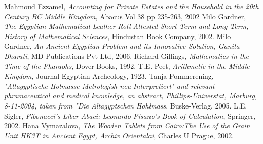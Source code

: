 \documentclass[12pt]{article}
\begin{document}
\begin{thebibliography}{8}
 Mahmoud Ezzamel, \emph{Accounting for Private Estates and the Household in the 20th Century BC Middle Kingdom}, Abacus Vol 38 pp 235-263, 2002
 Milo Gardner, \emph{The Egyptian Mathematical Leather Roll Attested Short Term and Long Term, History of Mathematical Sciences}, Hindustan Book Company, 2002.
 Milo Gardner, \emph{An Ancient Egyptian Problem and its Innovative Solution, Ganita Bharati}, MD Publications Pvt Ltd, 2006.
Richard Gillings, \emph{Mathematics in the Time of the Pharaohs}, Dover Books, 1992.
 T.E. Peet, \emph{Arithmetic in the Middle Kingdom}, Journal Egyptian Archeology, 1923.
 Tanja Pommerening, \emph{"Altagyptische Holmasse Metrologish neu Interpretiert" and relevant phramaceutical and medical knowledge, an abstract,  Phillips-Universtat, Marburg, 8-11-2004, taken from "Die Altagyptschen Hohlmass}, Buske-Verlag, 2005.
 L.E. Sigler, \emph{Fibonacci's Liber Abaci: Leonardo Pisano's Book of Calculation}, Springer, 2002.
 Hana Vymazalova, \emph{The Wooden Tablets from Cairo:The Use of the Grain Unit HK3T in Ancient Egypt, Archiv Orientalai}, Charles U Prague, 2002.
\end{thebibliography}










 

\end{document}
